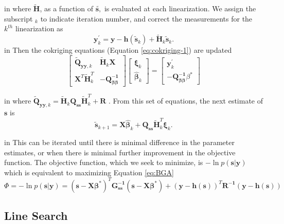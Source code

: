\documentclass[11pt,oneside,onecolumn]{usgsreport}
\begin{document}
\begin{appendix}
\begin{bibunit}
 in
where $\mathbf{\tilde{H}}$, as a function of $\mathbf{\tilde{s,}}$
is evaluated at each linearization. We assign the subscript $_{k}$
to indicate iteration number, and correct the measurements for the
$k^{th}$ linearization as 
\[
\mathbf{y}_{k}^{'}=\mathbf{y}-\mathbf{h}(\tilde{\mathbf{s}}_{k})+\tilde{\mathbf{H}}_{k}\tilde{\mathbf{s}}_{k}.
\]
 in
Then the cokriging equations (Equation \ref{eq:cokriging-1}) are
updated
\begin{equation}
\left[\begin{array}{cc}
\tilde{\mathbf{Q}}_{\mathbf{yy},k} & \tilde{\mathbf{H}}_{k}\mathbf{X}\\
\mathbf{X}^{T}\tilde{\mathbf{H}}_{k}^{T} & \mathbf{-}\mathbf{Q_{\beta\beta}^{-1}}
\end{array}\right]\left[\begin{array}{c}
\mathbf{\xi}_{k}\\
\hat{\mathbf{\beta}}_{k}
\end{array}\right]=\left[\begin{array}{c}
\mathbf{y}_{k}^{'}\\
\mathbf{-}\mathbf{Q_{\beta\beta}^{-1}}\beta^{*}
\end{array}\right]\label{eq:iterations-1}
\end{equation}

 in
where $\tilde{\mathbf{Q}}_{\mathbf{yy},k}=\tilde{\mathbf{H}}_{k}\mathbf{Q_{ss}}\tilde{\mathbf{H}}_{k}^{T}+\mathbf{R}$
. From this set of equations, the next estimate of $\mathbf{s}$ is
\[
\tilde{\mathbf{s}}_{k+1}=\mathbf{X\hat{\beta}}_{k}+\mathbf{Q_{ss}}\tilde{\mathbf{H}}_{k}^{T}\mathbf{\xi}_{k}.
\]

 in
This can be iterated until there is minimal difference in the parameter
estimates, or when there is minimal further improvement in the objective
function. The objective function, which we seek to minimize, is $\mathbf{-}\ln p\left(\mathbf{s|y}\right)$
which is equivalent to maximizing Equation \ref{eq:BGA}
\[
\Phi=\mathbf{-}\ln p\left(\mathbf{s|y}\right)=(\mathbf{s-X\beta}^{*})^{T}\mathbf{G_{\mathbf{ss}}^{-1}}(\mathbf{s-X\beta^{*}})+\left(\mathbf{y-h}(\mathbf{s})\right)^{T}\mathbf{R^{-1}\left(\mathbf{y-h}(\mathbf{s})\right)}
\]



\subsection{Line Search}


\end{bibunit}
\end{appendix}
\end{document}
